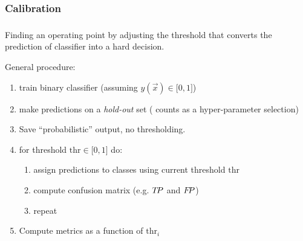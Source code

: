 \subsubsection{Calibration}

\begin{frame}\frametitle{\subsubsecname}

Finding an operating point by adjusting the threshold that converts the prediction of classifier into a hard decision.

General procedure:
\begin{enumerate}
\item train binary classifier (assuming $y(\vec x) \in \lbrack0,1\rbrack$)
\pause
\item make predictions on a \emph{hold-out} set ( counts as a hyper-parameter selection)
\pause
\item Save ``probabilistic'' output, no thresholding.
\pause
\item for threshold $\mathrm{thr} \in \lbrack0,1\rbrack$ do:
\begin{enumerate}
	\item assign predictions to classes using current threshold $\mathrm{thr}$
\pause
	\item compute confusion matrix (e.g. $T\kern-.4exP$ and $F\kern-.5exP$)
	\item[]repeat
\end{enumerate}
\item Compute metrics as a function of $\mathrm{thr}_i$
\end{enumerate}




\end{frame}

